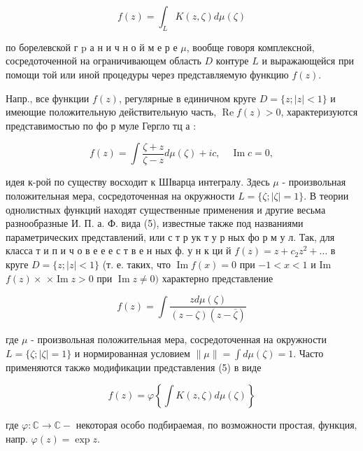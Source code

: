 \documentclass[10pt]{article}
\begin{document}
\[

f(z)=\int_{L} K(z, \zeta) d \mu(\zeta)

\]



по борелевской г $\mathrm{p}$ а н и ч н о й м е р е $\mu$, вообще говоря комплексной, сосредоточенной на ограничивающем область $D$ контуре $L$ и выражающейся при помощи той или иной процедуры через представляемую функцию $f(z)$.



Напр., все функции $f(z)$, регулярные в единичном круге $D=\{z ;|z|<1\}$ и имеющие положительную действительную часть, $\operatorname{Re} f(z)>0$, характеризуются представимостью по фо р муле Гергло тц а :



\[

f(z)=\int \frac{\zeta+z}{\zeta-z} d \mu(\zeta)+i c, \quad \operatorname{Im} c=0,

\]



идея к-рой по существу восходит к ШІварца интегралу. Здесь $\mu$ - произвольная положительная мера, сосредоточенная на окружности $L=\{\zeta ;|\zeta|=1\}$. В теории однолистных функций находят существенные применения и другие весьма разнообразные И. П. а. Ф. вида (5), известные также под названиями параметрических представлений, или с т р ук т у р ных фо р м у л. Так, для класса т и п и ч о в е е е с т в е н ных ф. у н к ци й $f(z)=z+c_{2} z^{2}+\ldots$ в круге $D=\{z ;|z|<1\}$ (т. е. таких, что $\operatorname{Im} f(x)=0$ при $-1<x<1$ и Im $f(z) \times$ $\times \operatorname{Im} z>0$ при $\operatorname{Im} z \neq 0)$ характерно представление



\[

f(z)=\int \frac{z d \mu(\zeta)}{(z-\zeta)(z-\bar{\zeta})}

\]



где $\mu$ - произвольная положительная мера, сосредоточенная на окружности $L=\{\zeta ;|\zeta|=1\}$ и нормированная условием $\|\mu\|=\int d \mu(\zeta)=1$. Часто применяются такжө модификации представления (5) в виде



\[

f(z)=\varphi\left\{\int K(z, \zeta) d \mu(\zeta)\right\}

\]



где $\varphi: \mathbb{C} \rightarrow \mathbb{C}-$ некоторая особо подбираемая, по возможности простая, функция, напр. $\varphi(z)=\exp z$.
\end{document}
